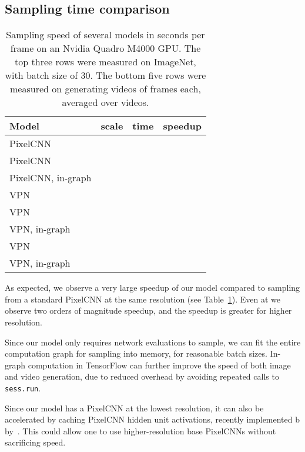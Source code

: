 \documentclass{article}
\begin{document}
\subsection{Sampling time comparison}
\begin{table}
\begin{center}
\begin{tabular}{| l | c |  c | c |}
\hline
\textbf{Model} & \textbf{scale} & \textbf{time} & \textbf{speedup} \\
\hline
\hline
\small{ PixelCNN} &  &  &  \\
\hline
\small{ PixelCNN} &  &  &  \\
\hline
\small{ PixelCNN}, in-graph &  &  &  \\
\hline
\hline
\small{ VPN} &  &  & \\
\hline
\small{ VPN} &  &  & \\
\hline
\small{ VPN}, in-graph &  &  &  \\
\hline
\small{ VPN} &  &  &  \\
\hline
\small{ VPN}, in-graph &  &  & \\
\hline
\end{tabular}
\end{center}
\vspace{-0.15in}
\caption{Sampling speed of several models in seconds per frame on an Nvidia Quadro M4000 GPU. The top three rows were measured on  ImageNet, with batch size of 30. The bottom five rows were measured on generating  videos of  frames each, averaged over  videos.\label{tab:speed}}
\vspace{-0.2in}
\end{table}


As expected, we observe a very large speedup of our model compared to sampling from a standard PixelCNN at the same resolution (see Table~\ref{tab:speed}).
Even at  we observe two orders of magnitude speedup, and the speedup is greater for higher resolution.


Since our model only requires  network evaluations to sample, we can fit the entire computation graph for sampling into memory, for reasonable batch sizes.
In-graph computation in TensorFlow can further improve the speed of both image and video generation, due to reduced overhead by avoiding repeated calls to \texttt{sess.run}.


Since our model has a PixelCNN at the lowest resolution, it can also be accelerated by caching PixelCNN hidden unit activations, recently implemented b by~\citet{ramachandran2017fastgeneration}.
This could allow one to use higher-resolution base PixelCNNs without sacrificing speed.
\end{document}
